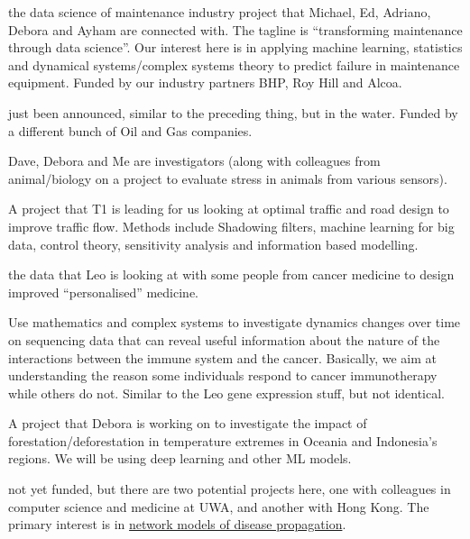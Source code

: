 \documentclass[10pt,a4paper]{Projects}
\begin{document}
the data science of maintenance industry project that Michael, Ed, Adriano, Debora and Ayham are connected with. The tagline is ``transforming maintenance through data science''. Our interest here is in applying machine learning, statistics and dynamical systems/complex systems theory to predict failure in maintenance equipment. Funded by our industry partners BHP, Roy Hill and Alcoa. 
 
just been announced, similar to the preceding thing, but in the water. Funded by a different bunch of Oil and Gas companies.

Dave, Debora and Me are investigators (along with colleagues from animal/biology on a project to evaluate stress in animals from various sensors). 

A project that T1 is leading for us looking at optimal traffic and road design to improve traffic flow. Methods include Shadowing filters, machine learning for big data, control theory, sensitivity analysis and information based modelling. 

the data that Leo is looking at with some people from cancer medicine to design improved “personalised” medicine. 

Use mathematics and complex systems to investigate dynamics changes over time on sequencing data that can reveal useful information about the nature of the interactions between the immune system and the cancer. Basically, we aim at understanding the reason some individuals respond to cancer immunotherapy while others do not. Similar to the Leo gene expression stuff, but not identical. 

A project that Debora is working on to investigate the impact of forestation/deforestation in temperature extremes in Oceania and Indonesia’s regions. We will be using deep learning and other ML models. 

not yet funded, but there are two potential projects here, one with colleagues in computer science and medicine at UWA, and another with Hong Kong. The primary interest is in \href{https://ieeexplore.ieee.org/abstract/document/9113296}{network models of disease propagation}. 
\end{document}
